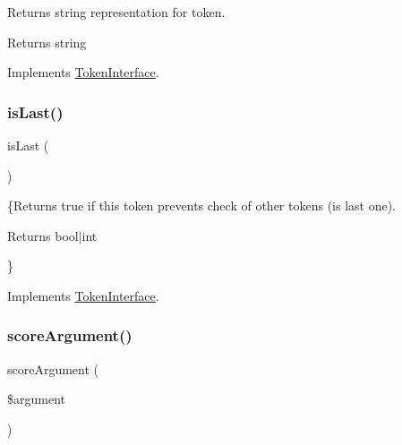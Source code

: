 Returns string representation for token.

\begin{DoxyReturn}{Returns}
string 
\end{DoxyReturn}


Implements \mbox{\hyperlink{interface_prophecy_1_1_argument_1_1_token_1_1_token_interface_a7516ca30af0db3cdbf9a7739b48ce91d}{Token\+Interface}}.

\mbox{\label{class_prophecy_1_1_argument_1_1_token_1_1_approximate_value_token_ac72b8349b1340887fc1af30eca2b951c}} 
\subsubsection{\texorpdfstring{is\+Last()}{isLast()}}
{\footnotesize\ttfamily is\+Last (\begin{DoxyParamCaption}{ }\end{DoxyParamCaption})}

\{Returns true if this token prevents check of other tokens (is last one).

\begin{DoxyReturn}{Returns}
bool$\vert$int
\end{DoxyReturn}
\} 

Implements \mbox{\hyperlink{interface_prophecy_1_1_argument_1_1_token_1_1_token_interface_ac72b8349b1340887fc1af30eca2b951c}{Token\+Interface}}.

\mbox{\label{class_prophecy_1_1_argument_1_1_token_1_1_approximate_value_token_a8d5bf47ab6eaa935458d5ad160e52822}} 
\subsubsection{\texorpdfstring{score\+Argument()}{scoreArgument()}}
{\footnotesize\ttfamily score\+Argument (\begin{DoxyParamCaption}\item[{}]{\$argument }\end{DoxyParamCaption})}

